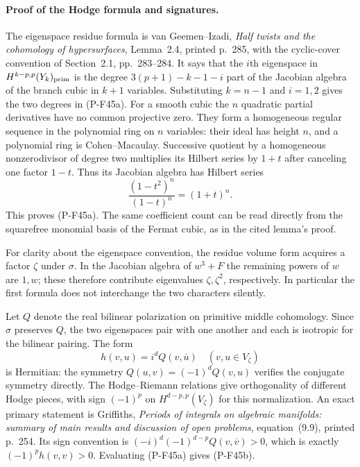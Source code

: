 \documentclass[11pt,a4paper]{article}
\begin{document}
\paragraph{Proof of the Hodge formula and signatures.}
The eigenspace residue formula is van Geemen--Izadi,
\emph{Half twists and the cohomology of hypersurfaces},
Lemma~2.4, printed p.~285, with the cyclic-cover convention
of Section~2.1, pp.~283--284. It says that the $i$th
eigenspace in $H^{k-p,p}(Y_k)_{\rm prim}$ is the degree
$3(p+1)-k-1-i$ part of the Jacobian algebra of the branch
cubic in $k+1$ variables. Substituting $k=n-1$ and
$i=1,2$ gives the two degrees in (P-F45a).
For a smooth cubic the $n$ quadratic partial derivatives
have no common projective zero. They form a homogeneous
regular sequence in the polynomial ring on $n$ variables:
their ideal has height $n$, and a polynomial ring is
Cohen--Macaulay. Successive quotient by a homogeneous
nonzerodivisor of degree two multiplies its Hilbert series
by $1+t$ after canceling one factor $1-t$. Thus its
Jacobian algebra has Hilbert series
\[
                      \frac{(1-t^2)^n}{(1-t)^n}
                            =(1+t)^n.
\]
This proves (P-F45a). The same coefficient count can be
read directly from the squarefree monomial basis of the
Fermat cubic, as in the cited lemma's proof.

For clarity about the eigenspace convention, the residue
volume form acquires a factor $\zeta$ under $\sigma$.
In the Jacobian algebra of $w^3+F$ the remaining powers
of $w$ are $1,w$; these therefore contribute eigenvalues
$\zeta,\zeta^2$, respectively. In particular the first
formula does not interchange the two characters silently.

Let $Q$ denote the real bilinear polarization on primitive
middle cohomology. Since $\sigma$ preserves $Q$, the two
eigenspaces pair with one another and each is isotropic
for the bilinear pairing. The form
\[
                        h(v,u)=i^d Q(v,\overline u)
                        \quad(v,u\in V_\zeta)
\]
is Hermitian: the symmetry $Q(u,v)=(-1)^dQ(v,u)$ verifies
the conjugate symmetry directly. The Hodge--Riemann
relations give orthogonality of different Hodge pieces,
with sign $(-1)^p$ on $H^{d-p,p}(V_\zeta)$ for this
normalization. An exact primary statement is Griffiths,
\emph{Periods of integrals on algebraic manifolds: summary
of main results and discussion of open problems},
equation~(9.9), printed p.~254. Its sign convention is
$(-i)^d(-1)^{d-p}Q(v,\overline v)>0$, which is exactly
$(-1)^p h(v,v)>0$. Evaluating (P-F45a) gives (P-F45b).
\end{document}
